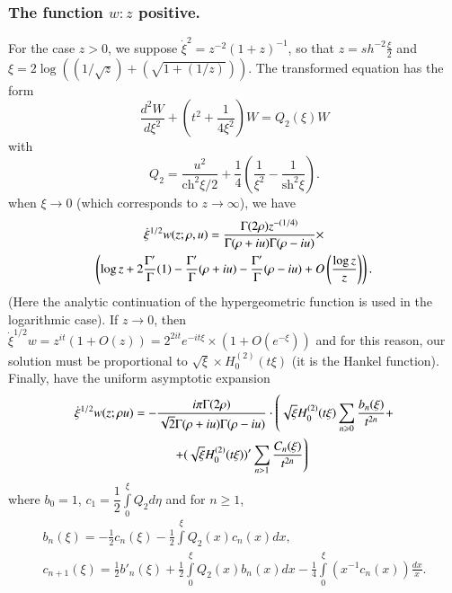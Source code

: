 \subsubsection{The function $w:z$ positive.}\label{art7-subsubsec2.6.4}
For the case $z>0$, we suppose $\dot{\xi}^2 = z^{-2} (1+z)^{-1}$, so that $z = sh^{-2} \frac{\xi}{2}$ and $\xi = 2 \log ((1/\sqrt{z}) + (\sqrt{1+ (1/z)}))$. The transformed equation has the form 
\setcounter{section}{7}
\setcounter{equation}{21}
\begin{equation}
\frac{d^2 W}{d\xi^2} + \left(t^2 + \frac{1}{4\xi^2} \right) W = Q_2 (\xi) W \label{art7-eq7.22}
\end{equation}
with 
\begin{equation}
Q_2 = \frac{u^2}{\text{ch}^2 \xi/2}  + \frac{1}{4} \left(\frac{1}{\xi^2} - \frac{1}{\text{sh}^2 \xi}  \right).\label{art7-eq7.23}
\end{equation}
when $\xi \to 0$ (which corresponds to $z \to \infty$), we have 
\begin{gather}
\dot{\xi}^{1/2} w (z; \rho, u) = \frac{\Gamma (2 \rho) z^{-(1/4)}}{\Gamma (\rho + iu) \Gamma (\rho - iu)} \times \label{art7-eq7.24}\\
\left(\log z+2 \frac{\Gamma'}{\Gamma} (1) - \frac{\Gamma'}{\Gamma} (\rho + iu) - \frac{\Gamma'}{\Gamma} (\rho - iu) + O \left( \frac{\log z}{z} \right) \right). \notag
\end{gather}
(Here the analytic continuation of the hypergeometric function is used in the logarithmic case). If $z \to 0$, then $\dot{\xi}^{1/2} w = z^{it} (1+ O(z)) =2^{2 it} e^{-it \xi} \times (1+ O (e^{-\xi}))$  and for this reason, our solution must be proportional to $\sqrt{\xi} \times H^{(2)}_0 (t \xi)$  (it is the Hankel function). Finally, have the uniform asymptotic expansion
\begin{gather}
\dot{\xi}^{1/2} w (z; \rho u) = - \frac{i\pi \Gamma (2 \rho)}{\sqrt{2} \Gamma (\rho + iu) \Gamma (\rho - iu)} \cdot \left(\sqrt{\xi} H^{(2)}_0 (t \xi) \sum\limits_{n \geqslant 0} \frac{b_n (\xi)}{t^{2n}} + \right.\label{art7-eq7.25}\\
 \quad  \left.  + (\sqrt{\xi} H^{(2)}_0 (t\xi))' \sum\limits_{n >1} \frac{C_n (\xi)}{t^{2n}} \right)\notag
\end{gather}
where $b_0 =1$, $c_1 = \dfrac{1}{2} \int\limits^\xi_0 Q_2 d \eta$ and for $n \geqslant 1$,
\begin{gather}
b_n(\xi) = -\frac{1}{2} c_n(\xi) - \frac{1}{2} \int\limits^\xi Q_2 (x) c_n (x) dx, \label{art7-eq7.26}\\
c_{n+1} (\xi) = \frac{1}{2} b'_n (\xi) + \frac{1}{2} \int\limits^\xi_0 Q_2 (x) b_n (x) dx - \frac{1}{4} \int\limits^\xi_0 (x^{-1} c_n(x)) \frac{dx}{x}. \label{art7-eq7.27}
\end{gather}\pageoriginale

